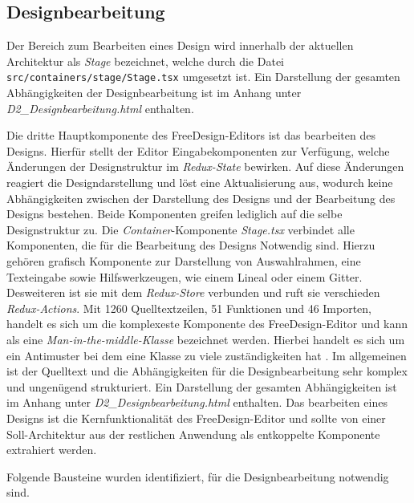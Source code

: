 \subsection{Designbearbeitung}
Der Bereich zum Bearbeiten eines Design wird innerhalb der aktuellen Architektur als \emph{Stage} bezeichnet, welche durch die Datei  
\lstinline|src/containers/stage/Stage.tsx| umgesetzt ist. 
Ein Darstellung der gesamten Abhängigkeiten der Designbearbeitung ist im Anhang unter \emph{D2\_Designbearbeitung.html} enthalten.




Die dritte Hauptkomponente des FreeDesign-Editors ist das bearbeiten des Designs. Hierfür stellt der Editor Eingabekomponenten zur Verfügung, welche Änderungen der Designstruktur im \emph{Redux-State} bewirken. Auf diese Änderungen reagiert die Designdarstellung und löst eine Aktualisierung aus, wodurch keine Abhängigkeiten zwischen der Darstellung des Designs und der Bearbeitung des Designs bestehen. Beide Komponenten greifen lediglich auf die selbe Designstruktur zu.  
Die \emph{Container}-Komponente \emph{Stage.tsx} verbindet alle Komponenten, die für die Bearbeitung des Designs Notwendig sind. Hierzu gehören grafisch Komponente zur Darstellung von Auswahlrahmen, eine Texteingabe sowie Hilfswerkzeugen, wie einem Lineal oder einem Gitter. 
Desweiteren ist sie mit dem \emph{Redux-Store} verbunden und ruft sie verschieden \emph{Redux-Actions}. 
Mit  1260 Quelltextzeilen, 51 Funktionen und 46 Importen, handelt es sich um die komplexeste Komponente des FreeDesign-Editor und kann als eine \emph{Man-in-the-middle-Klasse} bezeichnet werden. Hierbei handelt es sich um ein Antimuster bei dem eine Klasse zu viele zuständigkeiten hat \autocite[vgl.][619]{Geirhos2015}.
Im allgemeinen ist der Quelltext und die Abhängigkeiten für die Designbearbeitung sehr komplex und ungenügend strukturiert. 
Ein Darstellung der gesamten Abhängigkeiten ist im Anhang unter \emph{D2\_Designbearbeitung.html} enthalten.
Das bearbeiten eines Designs ist die Kernfunktionalität des FreeDesign-Editor und sollte von einer Soll-Architektur aus der restlichen Anwendung als entkoppelte Komponente extrahiert werden. 



Folgende Bausteine wurden identifiziert, für die Designbearbeitung notwendig sind.
\begin{multicols}{2}    
    
\end{multicols}
